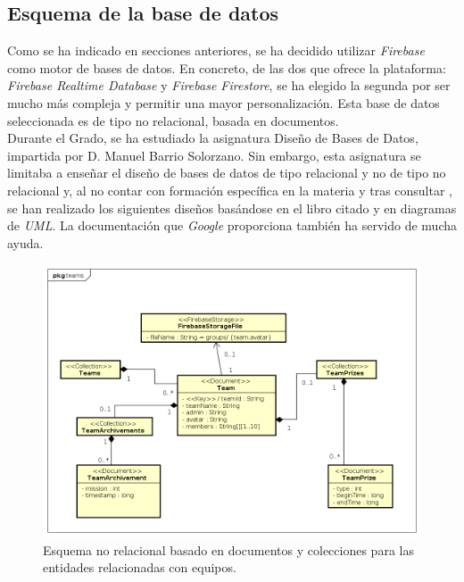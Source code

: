 \documentclass[twoside]{report}
\begin{document}
\subsection{Esquema de la base de datos}
Como se ha indicado en secciones anteriores, se ha decidido utilizar \textit{Firebase} como motor de bases de datos. En concreto, de las dos que ofrece la plataforma: \textit{Firebase Realtime Database} y \textit{Firebase Firestore}, se ha elegido la segunda por ser mucho más compleja y permitir una mayor personalización. Esta base de datos seleccionada es de tipo no relacional, basada en documentos. \\

Durante el Grado, se ha estudiado la asignatura Diseño de Bases de Datos, impartida por D. Manuel Barrio Solorzano. Sin embargo, esta asignatura se limitaba a enseñar el diseño de bases de datos de tipo relacional y no de tipo no relacional y, al no contar con formación específica en la materia y tras consultar \cite{databasedesign}, se han realizado los siguientes diseños basándose en el libro citado y en diagramas de \textit{UML}. La documentación que \textit{Google} proporciona \cite{fireference} también ha servido de mucha ayuda.

\begin{figure}[H]
\centering
\includegraphics[scale=0.5]{images/databaseNRteams}
\caption{Esquema no relacional basado en documentos y colecciones para las entidades relacionadas con equipos.}
\label{nrteams}
\end{figure}
\end{document}
